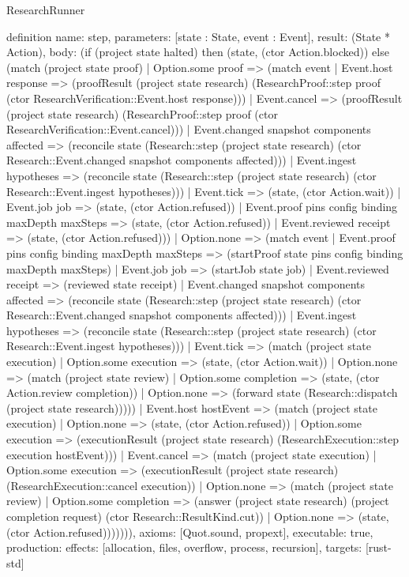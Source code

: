 \begin{lexlean}{ResearchRunner}
\begin{semanticmodule}
definition{
  name: step,
  parameters: [state : State, event : Event],
  result: (State * Action),
  body: (if (project state halted) then (state, (ctor Action.blocked)) else (match (project state proof)
    | Option.some proof => (match event
      | Event.host response => (proofResult (project state research) (ResearchProof::step proof (ctor ResearchVerification::Event.host response)))
      | Event.cancel => (proofResult (project state research) (ResearchProof::step proof (ctor ResearchVerification::Event.cancel)))
      | Event.changed snapshot components affected => (reconcile state (Research::step (project state research) (ctor Research::Event.changed snapshot components affected)))
      | Event.ingest hypotheses => (reconcile state (Research::step (project state research) (ctor Research::Event.ingest hypotheses)))
      | Event.tick => (state, (ctor Action.wait))
      | Event.job job => (state, (ctor Action.refused))
      | Event.proof pins config binding maxDepth maxSteps => (state, (ctor Action.refused))
      | Event.reviewed receipt => (state, (ctor Action.refused)))
    | Option.none => (match event
    | Event.proof pins config binding maxDepth maxSteps => (startProof state pins config binding maxDepth maxSteps)
    | Event.job job => (startJob state job)
    | Event.reviewed receipt => (reviewed state receipt)
    | Event.changed snapshot components affected => (reconcile state (Research::step (project state research) (ctor Research::Event.changed snapshot components affected)))
    | Event.ingest hypotheses => (reconcile state (Research::step (project state research) (ctor Research::Event.ingest hypotheses)))
    | Event.tick => (match (project state execution)
      | Option.some execution => (state, (ctor Action.wait))
      | Option.none => (match (project state review)
        | Option.some completion => (state, (ctor Action.review completion))
        | Option.none => (forward state (Research::dispatch (project state research)))))
    | Event.host hostEvent => (match (project state execution)
      | Option.none => (state, (ctor Action.refused))
      | Option.some execution => (executionResult (project state research) (ResearchExecution::step execution hostEvent)))
    | Event.cancel => (match (project state execution)
      | Option.some execution => (executionResult (project state research) (ResearchExecution::cancel execution))
      | Option.none => (match (project state review)
        | Option.some completion => (answer (project state research) (project completion request) (ctor Research::ResultKind.cut))
        | Option.none => (state, (ctor Action.refused))))))),
  axioms: [Quot.sound, propext],
  executable: true,
  production: {effects: [allocation, files, overflow, process, recursion], targets: [rust-std]}
}


\end{semanticmodule}
\end{lexlean}
